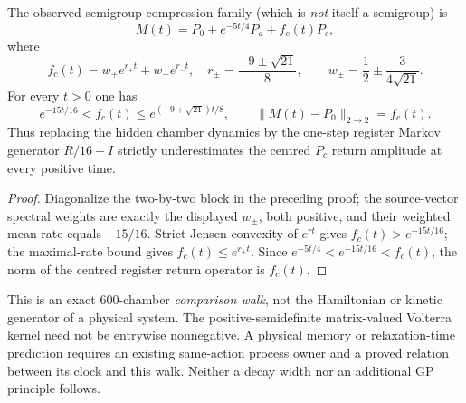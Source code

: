 \documentclass[11pt]{article}
\begin{document}
\begin{corollary}
\label{p1b:cor:cc13-relaxation}
The observed semigroup-compression family (which is \emph{not} itself a
semigroup) is
\[
 \boxed{M(t)=P_0+e^{-5t/4}P_a+f_c(t)P_c,}
\]
where
\[
 f_c(t)=w_+e^{r_+t}+w_-e^{r_-t},\quad
 r_\pm=\frac{-9\pm\sqrt{21}}8,\qquad
 w_\pm=\frac12\pm\frac{3}{4\sqrt{21}}.
\]
For every $t>0$ one has
\[
 \boxed{e^{-15t/16}<f_c(t)\le e^{(-9+\sqrt{21})t/8},\qquad
 \|M(t)-P_0\|_{2\to2}=f_c(t).}
\]
Thus replacing the hidden chamber dynamics by the one-step register
Markov generator $R/16-I$ strictly underestimates the centred
$P_c$ return amplitude at every positive time.
\end{corollary}
\begin{proof}
Diagonalize the two-by-two block in the preceding proof; the source-vector
spectral weights are exactly the displayed $w_\pm$, both positive, and
their weighted mean rate equals $-15/16$.  Strict Jensen convexity of
$e^{rt}$ gives $f_c(t)>e^{-15t/16}$; the maximal-rate bound gives
$f_c(t)\le e^{r_+t}$.  Since $e^{-5t/4}<e^{-15t/16}<f_c(t)$, the norm
of the centred register return operator is $f_c(t)$.
\end{proof}

\begin{remark}
This is an exact $600$-chamber \emph{comparison walk}, not the Hamiltonian
or kinetic generator of a physical system.  The positive-semidefinite
matrix-valued Volterra kernel need not be entrywise nonnegative.  A
physical memory or relaxation-time prediction requires an existing
same-action process owner and a proved relation between its clock and
this walk.  Neither a decay width nor an additional GP principle follows.
\end{remark}
\end{document}
